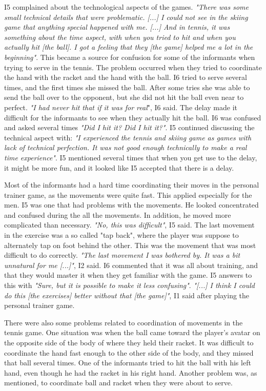 I5 complained about the technological aspects of the games. \emph{"There was some small technical details that were problematic. [...] I could not see in the skiing game that anything special happened with me. [...] And in tennis, it was something about the time aspect, with when you tried to hit and when you actually hit [the ball]. I got a feeling that they [the game] helped me a lot in the beginning"}. This became a source for confusion for some of the informants when trying to serve in the tennis. The problem occurred when they tried to coordinate the hand with the racket and the hand with the ball. I6 tried to serve several times, and the first times she missed the ball. After some tries she was able to send the ball over to the opponent, but she did not hit the ball even near to perfect. \emph{"I had never hit that if it was for real}", I6 said. The delay made it difficult for the informants to see when they actually hit the ball. I6 was confused and asked several times \emph{"Did I hit it? Did I hit it?"}. I5 continued discussing the technical aspect with: \emph{"I experienced the tennis and skiing game as games with lack of technical perfection. It was not good enough technically to make a real time experience"}. I5 mentioned several times that when you get use to the delay, it might be more fun, and it looked like I5 accepted that there is a delay. 

Most of the informants had a hard time coordinating their moves in the personal trainer game, as the movements were quite fast. This applied especially for the men. I5 was one that had problems with the movements. He looked concentrated and confused during the all the movements. In addition, he moved more complicated than necessary. \emph{"No, this was difficult"}, I5 said. The last movement in the exercise was a so called "tap back", where the player was suppose to alternately tap on foot behind the other. This was the movement that was most difficult to do correctly. \emph{"The last movement I was bothered by. It was a bit unnatural for me [...]"}, I2 said. I6 commented that it was all about training, and that they would master it when they get familiar with the game. I5 answers to this with \emph{"Sure, but it is possible to make it less confusing"}. \emph{"[...] I think I could do this [the exercises] better without that [the game]"}, I1 said after playing the personal trainer game. 

There were also some problems related to coordination of movements in the tennis game. One situation was when the ball came toward the player's avatar on the opposite side of the body of where they held their racket. It was difficult to coordinate the hand fast enough to the other side of the body, and they missed that ball several times. One of the informants tried to hit the ball with his left hand, even though he had the racket in his right hand. Another problem was, as mentioned, to coordinate ball and racket when they were about to serve. 

